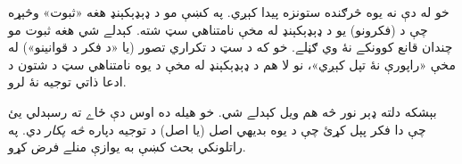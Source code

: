 \documentclass[../../../include/open-logic-section]{subfiles}
\begin{document}
خو له دې نه يوه څرګنده ستونزه پيدا کېږي. په
 کښې مو د ډېډېکېنډ هغه
«ثبوت» وڅېړه چې د (فکرونو) يو د ډېډېکېنډ له مخې نامتناهي سټ شته.
کېدلے شي هغه ثبوت مو چندان قانع کوونکے نۀ وي ګڼلے. خو که
\stagesinf{} د سټ د تکراري تصور (يا «د فکر د قوانينو») له مخې
«راپورې نۀ تپل کېږي»، نو لا هم د ډېډېکېنډ له مخې د يوه نامتناهي
سټ د شتون د ادعا ذاتي توجيه نۀ لرو.

بېشکه دلته ډېر نور څه هم ويل کېدلے شي. خو هيله ده اوس دې ځاے ته
رسېدلي يئ چې دا فکر پېل کړئ چې د يوه بديهي اصل (يا اصل) د
توجيه دپاره \emph{څه پکار} دي. په راتلونکي بحث کښې به
\stagesinf{} يوازې منلے فرض کړو.
\end{document}
